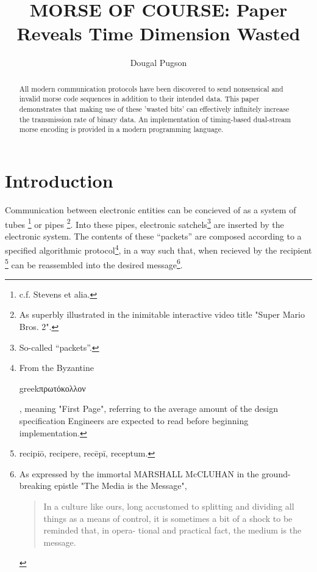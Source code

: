 \documentclass[sigplan]{acmart}
\begin{document}
\title[MORSE OF COURSE: Paper Reveals Time Dimension Wasted]{MORSE OF COURSE: Paper Reveals Time Dimension Wasted}

\author{Dougal Pugson}

\begin{abstract}
All modern communication protocols have been discovered to send
nonsensical and invalid morse code sequences in addition to their
intended data. This paper demonstrates that making use of these
'wasted bits' can effectively infinitely increase the transmission
rate of binary data.
An implementation of timing-based dual-stream morse
encoding is provided in a modern programming language.
\end{abstract}



\maketitle

\section{Introduction}\label{introduction}

Communication between electronic entities can be concieved of as a system
of tubes \footnote{ c.f. Stevens et alia.} or pipes \footnote{ As superbly illustrated in the inimitable
interactive video title "Super Mario Bros. 2".}.
Into these pipes, electronic satchels\footnote{So-called ``packets''.} are inserted
by the electronic system. The contents of these ``packets'' are composed
according to a specified algorithmic protocol\footnote{ From the Byzantine \begin{otherlanguage*}{greek}πρωτόκολλον\end{otherlanguage*}, meaning "First Page",
referring to the average amount of the design specification Engineers are expected to read
before beginning implementation.}, in a way such that, when recieved by the
recipient \footnote{recipiō, recipere, recēpī, receptum.} can be reassembled into
the desired message\footnote{%
As expressed by the immortal MARSHALL McCLUHAN in the ground-breaking epistle
"The Media is the Message",

\begin{quote}
In a culture like ours, long accustomed to splitting and 
dividing all things as a means of control, it is sometimes
a bit of a shock to be reminded that, in opera- tional
and practical fact, the medium is the message.
\end{quote}}.
\end{document}
